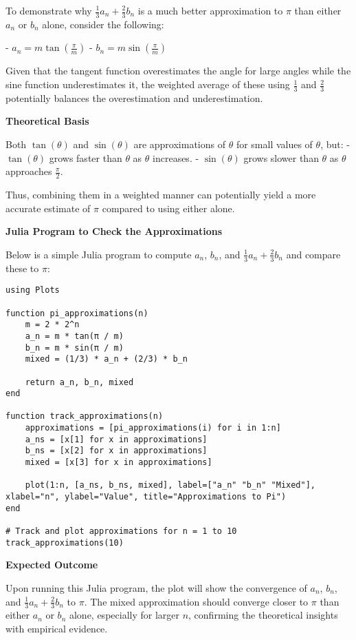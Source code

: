 \documentclass[8pt]{article}
\begin{document}
To demonstrate why \( \frac{1}{3}a_n + \frac{2}{3}b_n \) is a much better approximation to \( \pi \) than either \( a_n \) or \( b_n \) alone, consider the following:

- \( a_n = m \tan \left(\frac{\pi}{m}\right) \)
- \( b_n = m \sin \left(\frac{\pi}{m}\right) \)

Given that the tangent function overestimates the angle for large angles while the sine function underestimates it, the weighted average of these using \( \frac{1}{3} \) and \( \frac{2}{3} \) potentially balances the overestimation and underestimation.

\textbf{Theoretical Basis}

Both \( \tan(\theta) \) and \( \sin(\theta) \) are approximations of \( \theta \) for small values of \( \theta \), but:
- \( \tan(\theta) \) grows faster than \( \theta \) as \( \theta \) increases.
- \( \sin(\theta) \) grows slower than \( \theta \) as \( \theta \) approaches \( \frac{\pi}{2} \).

Thus, combining them in a weighted manner can potentially yield a more accurate estimate of \( \pi \) compared to using either alone.

\textbf{Julia Program to Check the Approximations}

Below is a simple Julia program to compute \( a_n \), \( b_n \), and \( \frac{1}{3}a_n + \frac{2}{3}b_n \) and compare these to \( \pi \):

\begin{verbatim}
using Plots

function pi_approximations(n)
    m = 2 * 2^n
    a_n = m * tan(π / m)
    b_n = m * sin(π / m)
    mixed = (1/3) * a_n + (2/3) * b_n
    
    return a_n, b_n, mixed
end

function track_approximations(n)
    approximations = [pi_approximations(i) for i in 1:n]
    a_ns = [x[1] for x in approximations]
    b_ns = [x[2] for x in approximations]
    mixed = [x[3] for x in approximations]

    plot(1:n, [a_ns, b_ns, mixed], label=["a_n" "b_n" "Mixed"], xlabel="n", ylabel="Value", title="Approximations to Pi")
end

# Track and plot approximations for n = 1 to 10
track_approximations(10)
\end{verbatim}

\textbf{Expected Outcome}

Upon running this Julia program, the plot will show the convergence of \( a_n \), \( b_n \), and \( \frac{1}{3}a_n + \frac{2}{3}b_n \) to \( \pi \). The mixed approximation should converge closer to \( \pi \) than either \( a_n \) or \( b_n \) alone, especially for larger \( n \), confirming the theoretical insights with empirical evidence.
\end{document}
